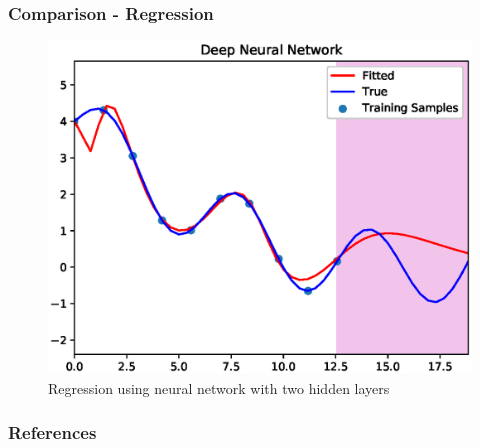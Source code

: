 \documentclass{beamer}
\begin{document}
% 
% 
% 
% 
\begin{frame}
  \frametitle{Comparison - Regression}
  \vspace*{-0.15cm}
  \begin{figure}[!h]
    \centering
    \includegraphics[width=0.8\linewidth]{./figs/nn.eps}
    \caption{Regression using neural network with two hidden layers}
    \label{fig:nn}
  \end{figure}
\end{frame}
% 
% 
% 
% 


\begin{frame}
  \frametitle{References}
  \printbibliography
\end{frame}

\end{document}
